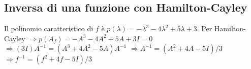 \subsection{Inversa di una funzione con Hamilton-Cayley}

Il polinomio caratteristico di $f$ è $p(\lambda) = -\lambda^3-4\lambda^2+5\lambda+3$.
Per Hamilton-Cayley $\Rightarrow p(A_f) = -A^3-4A^2+5A+3I = 0$
$\Rightarrow (3I)A^{-1} = (A^3+4A^2-5A)A^{-1}$
$\Rightarrow A^{-1} = (A^2+4A-5I)/3$
$\Rightarrow f^{-1} = (f^2+4f-5I)/3$
